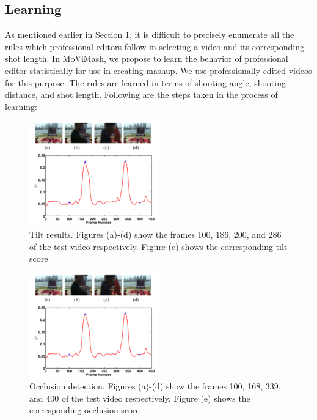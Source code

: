 \documentclass{new}
\begin{document}
\subsection{Learning}
As mentioned earlier in Section 1, it is difficult to precisely enumerate all the rules which professional editors follow in selecting
a video and its corresponding shot length. In MoViMash, we propose to learn the behavior of professional editor statistically for use
in creating mashup. We use professionally edited videos for this
purpose. The rules are learned in terms of shooting angle, shooting distance, and shot length. Following are the steps taken in the
process of learning:
\begin{figure}[h]
    \centering
    \includegraphics[width=0.5\textwidth]{img3.png}
    \caption{Tilt results. Figures (a)-(d) show the frames 100, 186,
200, and 286 of the test video respectively. Figure (e) shows the
corresponding tilt score}
    \label{fig:mesh4}
\end{figure}
\begin{figure}[h]
    \centering
    \includegraphics[width=0.5\textwidth]{img3.png}
    \caption{Occlusion detection. Figures (a)-(d) show the frames
100, 168, 339, and 400 of the test video respectively. Figure (e)
shows the corresponding occlusion score}
    \label{fig:mesh3}
\end{figure}
\end{document}
